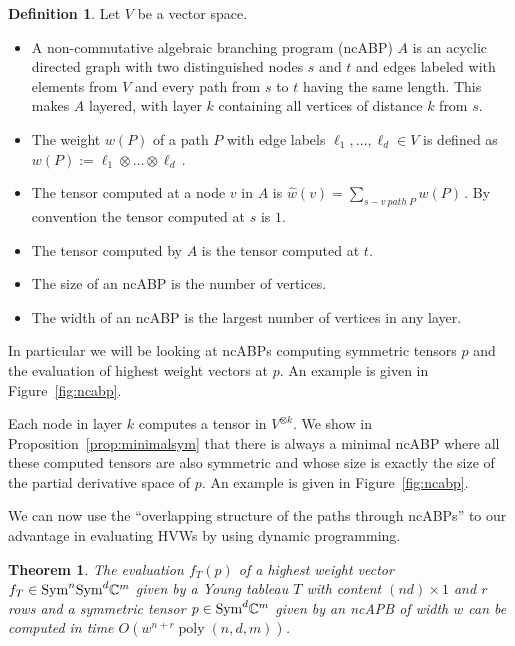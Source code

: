 \documentclass[10pt,a4paper]{article}
\numberwithin{equation}{section}
\newtheorem{theorem}[equation]{Theorem}
\theoremstyle{definition}
\newtheorem{definition}[equation]{Definition}
\newcommand{\Sym}{\textup{Sym}}
\newcommand{\IC}{\mathbb{C}}
\DeclareMathOperator{\poly}{poly}
\begin{document}
\begin{definition}\label{def:ncabp}
    Let $V$ be a vector space.
    \begin{itemize}
        \item
            A non-commutative algebraic branching program (ncABP) $A$ is an acyclic directed graph with two distinguished nodes $s$ and $t$ and edges labeled with elements from $V$ and every path from $s$ to $t$ having the same length.
            This makes $A$ layered, with layer $k$ containing all vertices of distance $k$ from $s$.
        \item
            The weight $w(P)$ of a path $P$ with edge labels $\ell_1, \ldots, \ell_d \in V$ is defined as
            $
                w(P) := \ell_1 \otimes \dots \otimes \ell_d\,.
            $
        \item
            The tensor computed at a node $v$ in $A$ is
            $
                \hat{w}(v) = \sum_{s-v\ path\ P}w(P)\,.
            $
            By convention the tensor computed at $s$ is $1$.
        \item
            The tensor computed by $A$ is the tensor computed at $t$.
        \item
            The size of an ncABP is the number of vertices.
        \item
            The width of an ncABP is the largest number of vertices in any layer.
    \end{itemize}
\end{definition}
In particular we will be looking at ncABPs computing symmetric tensors $p$ and the evaluation of highest weight vectors at $p$.
An example is given in Figure~\ref{fig:ncabp}.

Each node in layer $k$ computes a tensor in $V^{\otimes k}$.
We show in Proposition~\ref{prop:minimalsym} that there is always a minimal ncABP where all these computed tensors are also symmetric and whose size is exactly the size of the partial derivative space of $p$.
An example is given in Figure~\ref{fig:ncabp}.

We can now use the ``overlapping structure of the paths through ncABPs'' to our advantage in evaluating HVWs by using dynamic programming.

\begin{theorem}
    \label{thm:evalabp}
    The evaluation $f_T(p)$ of a highest weight vector $f_T \in \Sym^n\Sym^d \IC^m$ given by a Young tableau $T$ with content $(nd) \times 1$ and $r$ rows and a symmetric tensor $p \in \Sym^d\IC^m$ given by an ncAPB of width $w$ can be computed in time $O(w^{n + r}\poly(n,d,m))$.
\end{theorem}
\end{document}
